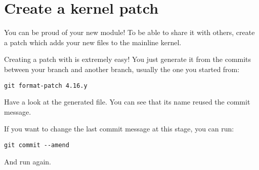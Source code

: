\section{Create a kernel patch}

You can be proud of your new module! To be able to share it with
others, create a patch which adds your new files to the mainline
kernel.

Creating a patch with  is extremely easy! You just generate it
from the commits between your branch and another branch, usually the
one you started from:

\begin{verbatim}
git format-patch 4.16.y
\end{verbatim}

Have a look at the generated file. You can see that its name reused
the commit message.

If you want to change the last commit message at this stage, you
can run:

\begin{verbatim}
git commit --amend
\end{verbatim}

And run  again.
